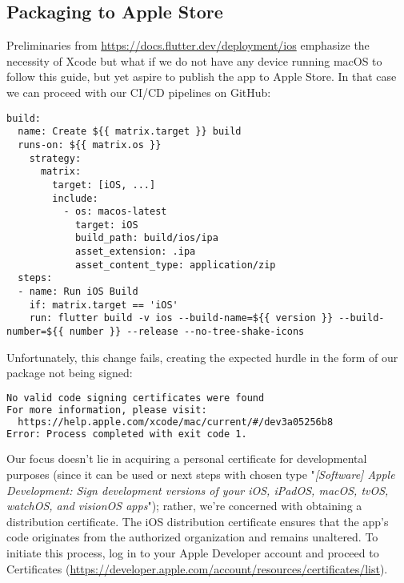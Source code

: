 
\subsection{Packaging to Apple Store}

Preliminaries from \href{https://docs.flutter.dev/deployment/ios}{https://docs.flutter.dev/deployment/ios} emphasize 
the necessity of Xcode but what if we do not have any device running macOS to follow this guide, but yet aspire to 
publish the app to Apple Store. In that case we can proceed with our CI/CD pipelines on GitHub:

\begin{lstlisting}
build:
  name: Create ${{ matrix.target }} build
  runs-on: ${{ matrix.os }}
    strategy:
      matrix:
        target: [iOS, ...]
        include:
          - os: macos-latest
            target: iOS
            build_path: build/ios/ipa
            asset_extension: .ipa
            asset_content_type: application/zip
  steps:
  - name: Run iOS Build
    if: matrix.target == 'iOS'
    run: flutter build -v ios --build-name=${{ version }} --build-number=${{ number }} --release --no-tree-shake-icons
\end{lstlisting}

\noindent Unfortunately, this change fails, creating the expected hurdle in the form of our package not being signed:

\begin{lstlisting}[language=bash]
No valid code signing certificates were found
For more information, please visit:
  https://help.apple.com/xcode/mac/current/#/dev3a05256b8
Error: Process completed with exit code 1.
\end{lstlisting}

Our focus doesn't lie in acquiring a personal certificate for developmental purposes (since it can be used 
 or next steps with chosen type "\emph{[Software] Apple Development: Sign 
development versions of your iOS, iPadOS, macOS, tvOS, watchOS, and visionOS apps}"); rather, we're concerned with 
obtaining a distribution certificate. The iOS distribution certificate ensures that the app's code originates from the 
authorized organization and remains unaltered. To initiate this process, log in to your Apple Developer account and 
proceed to Certificates
(\href{https://developer.apple.com/account/resources/certificates/list}{https://developer.apple.com/account/resources/certificates/list}).

